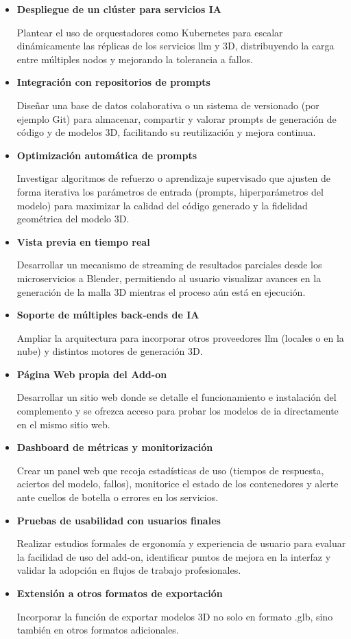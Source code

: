 \begin{itemize}
   \item \textbf{Despliegue de un clúster para servicios IA}

         Plantear el uso de orquestadores como Kubernetes para escalar dinámicamente las réplicas de los servicios \gls{llm} y 3D, distribuyendo la carga entre múltiples nodos y mejorando la tolerancia a fallos.
   \item \textbf{Integración con repositorios de prompts}

         Diseñar una base de datos colaborativa o un sistema de versionado (por ejemplo Git) para almacenar, compartir y valorar prompts de generación de código y de modelos 3D, facilitando su reutilización y mejora continua.
   \item \textbf{Optimización automática de prompts}

         Investigar algoritmos de refuerzo o aprendizaje supervisado que ajusten de forma iterativa los parámetros de entrada (prompts, hiperparámetros del modelo) para maximizar la calidad del código generado y la fidelidad geométrica del modelo 3D.
   \item \textbf{Vista previa en tiempo real}

         Desarrollar un mecanismo de streaming de resultados parciales desde los microservicios a Blender, permitiendo al usuario visualizar avances en la generación de la malla 3D mientras el proceso aún está en ejecución.
   \item \textbf{Soporte de múltiples back-ends de IA}

         Ampliar la arquitectura para incorporar otros proveedores \gls{llm} (locales o en la nube) y distintos motores de generación 3D.
   \item \textbf{Página Web propia del Add-on}

         Desarrollar un sitio web donde se detalle el funcionamiento e instalación del complemento y se ofrezca acceso para probar los modelos de \gls{ia} directamente en el mismo sitio web.
   \item \textbf{Dashboard de métricas y monitorización}

         Crear un panel web que recoja estadísticas de uso (tiempos de respuesta, aciertos del modelo, fallos), monitorice el estado de los contenedores y alerte ante cuellos de botella o errores en los servicios.
   \item \textbf{Pruebas de usabilidad con usuarios finales}

         Realizar estudios formales de ergonomía y experiencia de usuario para evaluar la facilidad de uso del add-on, identificar puntos de mejora en la interfaz y validar la adopción en flujos de trabajo profesionales.
   \item \textbf{Extensión a otros formatos de exportación}

         Incorporar la función de exportar modelos 3D no solo en formato .glb, sino también en otros formatos adicionales.
\end{itemize}

